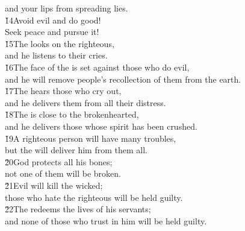 \begin{poetry}
\poemll    and your lips from spreading lies. \\
\poeml \v{14}Avoid evil and do good! \\
\poemll    Seek peace and pursue it! \\
\poeml \v{15}The  looks on the righteous, \\
\poemll    and he listens to their cries. \\
\poeml \v{16}The face of the  is set against those who do evil, \\
\poemll    and he will remove people's recollection of them from the earth. \\
\poeml \v{17}The  hears those who cry out, \\
\poemll    and he delivers them from all their distress. \\
\poeml \v{18}The  is close to the brokenhearted, \\
\poemll    and he delivers those whose spirit has been crushed. \\
\poeml \v{19}A righteous person will have many troubles, \\
\poemll    but the  will deliver him from them all. \\
\poeml \v{20}God protects all his bones; \\
\poemll    not one of them will be broken. \\
\poeml \v{21}Evil will kill the wicked; \\
\poemll    those who hate the righteous will be held guilty. \\
\poeml \v{22}The  redeems the lives of his servants; \\
\poemll    and none of those who trust in him will be held guilty.
\end{poetry}

